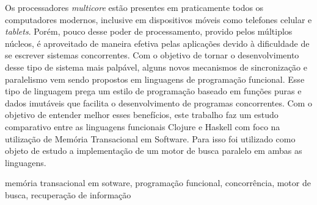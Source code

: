Os processadores \emph{multicore} estão presentes em praticamente todos os computadores modernos, inclusive em dispositivos móveis como telefones celular e \emph{tablets}. Porém, pouco desse poder de processamento, provido pelos múltiplos núcleos, é aproveitado de maneira efetiva pelas aplicações devido à dificuldade de se escrever sistemas concorrentes. Com o objetivo de tornar o desenvolvimento desse tipo de sistema mais palpável, alguns novos mecanismos de sincronização e paralelismo vem sendo propostos em linguagens de programação funcional. Esse tipo de linguagem prega um estilo de programação baseado em funções puras e dados imutáveis que facilita o desenvolvimento de programas concorrentes. Com o objetivo de entender melhor esses benefícios, este trabalho faz um estudo comparativo entre as linguagens funcionais Clojure e Haskell com foco na utilização de Memória Transacional em Software. Para isso foi utilizado como objeto de estudo a implementação de um motor de busca paralelo em ambas as linguagens.

\begin{keywords}
memória transacional em sotware, programação funcional, concorrência, motor de busca, recuperação de informação
\end{keywords}
